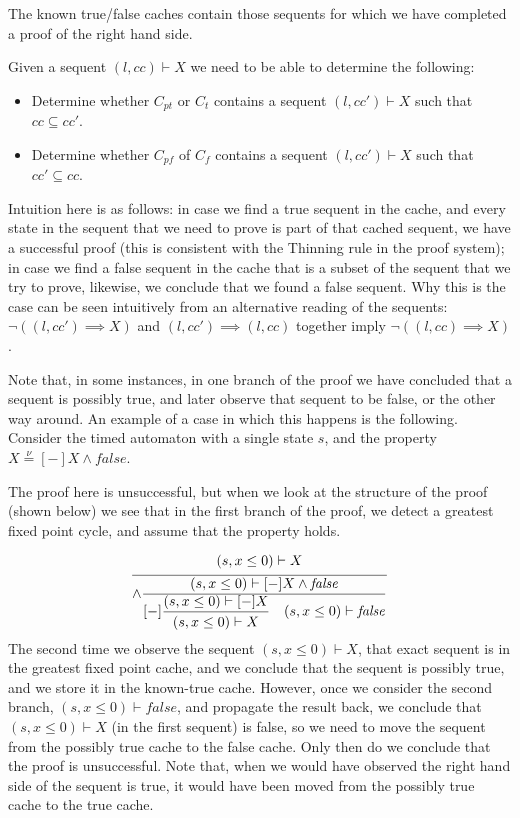 \documentclass{article}
\newcommand{\proofrule}[3][]{#1 \frac{\raisebox{.7ex}{\normalsize{$#2$}}}
  {\raisebox{-1.0ex}{\normalsize{$#3$}}}}
\newcommand{\loc}{l}
\newcommand{\region}{\mathit{cc}}
\begin{document}
The known true/false caches contain those sequents for which we have completed a proof of the right hand side.

Given a sequent $(\loc, \region) \vdash X$ we need to be able to determine the following:
\begin{itemize}
  \item Determine whether $C_{pt}$ or $C_{t}$ contains a sequent $(\loc, \region') \vdash X$ such that $\region \subseteq \region'$.
  \item Determine whether $C_{pf}$ of $C_{f}$ contains a sequent $(\loc, \region') \vdash X$ such that $\region' \subseteq \region$.
\end{itemize}
Intuition here is as follows: in case we find a true sequent in the cache, and every state in the sequent that we need to prove is part of that cached sequent, we have a successful proof (this is consistent with the Thinning rule in the proof system); in case we find a false sequent in the cache that is a subset of the sequent that we try to prove, likewise, we conclude that we found a false sequent. Why this is the case can be seen intuitively from an alternative reading of the sequents: $\lnot((\loc, \region') \implies X)$ and $(\loc, \region') \implies (\loc, \region)$ together imply $\lnot((\loc, \region) \implies X)$.

Note that, in some instances, in one branch of the proof we have concluded that a sequent is possibly true, and later observe that sequent to be false, or the other way around. An example of a case in which this happens is the following. Consider the timed automaton with a single state $s$, and the property $X \stackrel{\nu}{=} [-]X \land \mathit{false}$.


The proof here is unsuccessful, but when we look at the structure of the proof (shown below) we see that in the first branch of the proof, we detect a greatest fixed point cycle, and assume that the property holds.

\[
\proofrule
{(s,x \leq 0) \vdash X}
{
  \proofrule[\land]
  {(s,x \leq 0) \vdash [-]X \land \mathit{false}}
  {
    \proofrule[{[-]}]
    {(s,x \leq 0) \vdash [-]X}
    {
      (s,x \leq 0) \vdash X
    }
    \quad
    (s,x \leq 0) \vdash \mathit{false}
  }
}
\]
The second time we observe the sequent $(s, x \leq 0) \vdash X$, that exact sequent is in the greatest fixed point cache, and we conclude that the sequent is possibly true, and we store it in the known-true cache. However, once we consider the second branch, $(s, x \leq 0) \vdash \mathit{false}$, and propagate the result back, we conclude that $(s, x \leq 0) \vdash X$ (in the first sequent) is false, so we need to move the sequent from the possibly true cache to the false cache. Only then do we conclude that the proof is unsuccessful. Note that, when we would have observed the right hand side of the sequent is true, it would have been moved from the possibly true cache to the true cache.
\end{document}
